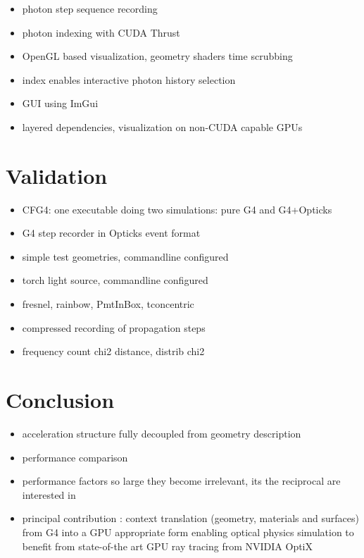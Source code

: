 \documentclass[a4paper]{jpconf}
\begin{document}
\begin{itemize}

\item photon step sequence recording
\item photon indexing with CUDA Thrust 
\item OpenGL based visualization, geometry shaders time scrubbing 
\item index enables interactive photon history selection
\item GUI using ImGui\cite{ImGui}  %
\item layered dependencies, visualization on non-CUDA capable GPUs
\end{itemize}



\section{Validation}


\begin{itemize}
\item CFG4: one executable doing two simulations: pure G4 and G4+Opticks 

\item G4 step recorder in Opticks event format
\item simple test geometries, commandline configured 
\item torch light source, commandline configured 
\item fresnel, rainbow, PmtInBox, tconcentric
\item compressed recording of propagation steps
\item frequency count chi2 distance, distrib chi2
\end{itemize}

\section{Conclusion}

\begin{itemize}
\item acceleration structure fully decoupled from geometry description 
\item performance comparison
\item performance factors so large they become irrelevant, its the reciprocal are interested in 
\item principal contribution : context translation (geometry, materials and surfaces) from G4 into a GPU appropriate form
      enabling optical physics simulation to benefit from state-of-the art GPU ray tracing from NVIDIA OptiX
\end{itemize}
\end{document}
